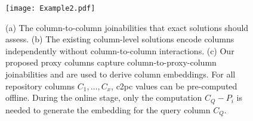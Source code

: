 





\begin{figure}
  \centering
  \texttt{[image: Example2.pdf]} \vspace{-5mm}
   \caption{(a) The column-to-column  joinabilities that exact solutions should assess. (b) The existing column-level solutions encode columns independently without column-to-column interactions. (c)  Our proposed proxy columns capture column-to-proxy-column joinabilities and are used to derive column embeddings. For all repository columns $C_1, \dots, C_x$, c2pc values can be pre-computed offline. During the online stage,  only the computation $C_Q - P_i$ is needed to generate the embedding for the query column $C_Q$.}
   \vspace{-3mm}
   \label{fig:exm2}
\end{figure}

